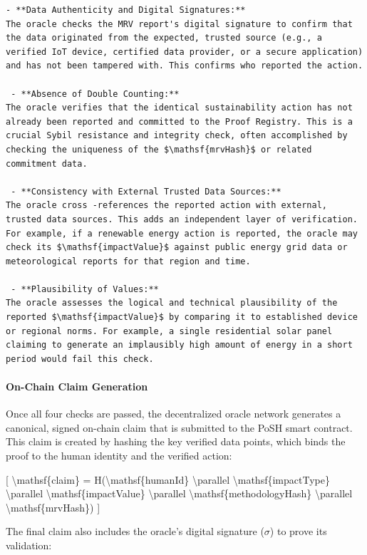 \documentclass{article}
\begin{document}
\begin{verbatim}
- **Data Authenticity and Digital Signatures:**
The oracle checks the MRV report's digital signature to confirm that the data originated from the expected, trusted source (e.g., a verified IoT device, certified data provider, or a secure application) and has not been tampered with. This confirms who reported the action.

 - **Absence of Double Counting:**
The oracle verifies that the identical sustainability action has not already been reported and committed to the Proof Registry. This is a crucial Sybil resistance and integrity check, often accomplished by checking the uniqueness of the $\mathsf{mrvHash}$ or related commitment data.

 - **Consistency with External Trusted Data Sources:**
The oracle cross -references the reported action with external, trusted data sources. This adds an independent layer of verification. For example, if a renewable energy action is reported, the oracle may check its $\mathsf{impactValue}$ against public energy grid data or meteorological reports for that region and time.

 - **Plausibility of Values:**
The oracle assesses the logical and technical plausibility of the reported $\mathsf{impactValue}$ by comparing it to established device or regional norms. For example, a single residential solar panel claiming to generate an implausibly high amount of energy in a short period would fail this check.
\end{verbatim}

\paragraph{On-Chain Claim Generation}

Once all four checks are passed, the decentralized oracle network generates a canonical, signed on-chain claim that is submitted to the PoSH smart contract. This claim is created by hashing the key verified data points, which binds the proof to the human identity and the verified action:

[
{\textbackslash}mathsf\{claim\} = H({\textbackslash}mathsf\{humanId\} {\textbackslash}parallel {\textbackslash}mathsf\{impactType\} {\textbackslash}parallel {\textbackslash}mathsf\{impactValue\} {\textbackslash}parallel {\textbackslash}mathsf\{methodologyHash\} {\textbackslash}parallel {\textbackslash}mathsf\{mrvHash\})
]

The final claim also includes the oracle's digital signature ($\sigma$) to prove its validation:
\end{document}
